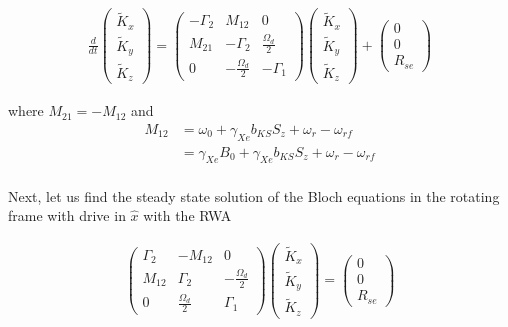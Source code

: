 \documentclass{article}
\begin{document}
\begin{align}
    \boxed{\frac{d}{dt}\left(\begin{array}{c}
        \tilde{K}_{x}\\
        \tilde{K}_{y}\\
        \tilde{K}_{z}
    \end{array}\right)=
   \left(\begin{matrix}
    -\Gamma_2 & M_{12}    &  0 \\
    M_{21} &  - \Gamma_2 &  \frac{\Omega_d}{2} \\ 0 &  -\frac{\Omega_d}{2}  &  -\Gamma_1 
    \end{matrix}\right)
    \left(\begin{array}{c}
        \tilde{K}_{x}\\
        \tilde{K}_{y}\\
        \tilde{K}_{z}
    \end{array}\right) + 
    \left(\begin{matrix}
         0  \\
         0  \\
         R_{se} 
    \end{matrix}\right)}\label{eq:Bloch_equations}
\end{align}

where $M_{21}=-M_{12}$ and
\begin{align}
    M_{12} &= \omega_{0}+\gamma_{Xe}b_{KS}S_z+\omega_r-\omega_{rf}\\
        &= \gamma_{Xe}B_0+\gamma_{Xe}b_{KS}S_z+\omega_r-\omega_{rf}\\
\end{align}

Next, let us find the steady state solution of the Bloch equations in the rotating frame with drive in $\hat{x}$ with the RWA

\begin{align}
    \left(\begin{matrix}
    \Gamma_2 & -M_{12}    &  0 \\
    M_{12} &   \Gamma_2 &  -\frac{\Omega_d}{2} \\ 0 &  \frac{\Omega_d}{2}  &  \Gamma_1 
    \end{matrix}\right)
    \left(\begin{array}{c}
        \tilde{K}_{x}\\
        \tilde{K}_{y}\\
        \tilde{K}_{z}
    \end{array}\right) = 
    \left(\begin{matrix}
         0  \\
         0  \\
         R_{se} 
    \end{matrix}\right)
\end{align}
\end{document}
